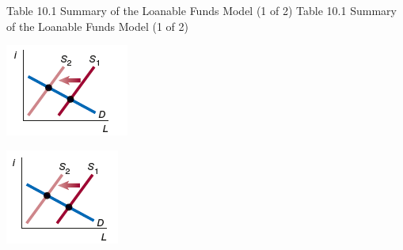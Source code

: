 \documentclass[
  12pt,
  ignorenonframetext,
]{beamer}
\begin{document}
\begin{frame}{Table 10.1 Summary of the Loanable Funds Model (1 of 2)}
\label{table-10.1-summary-of-the-loanable-funds-model-1-of-2}
Table 10.1 Summary of the Loanable Funds Model (1 of 2)

\includegraphics[width=\textwidth,height=0.99\textheight]{imgs3/img_slide31a.png}

\includegraphics[width=\textwidth,height=0.99\textheight]{imgs3/img_slide31b.png}


\end{frame}
\end{document}
